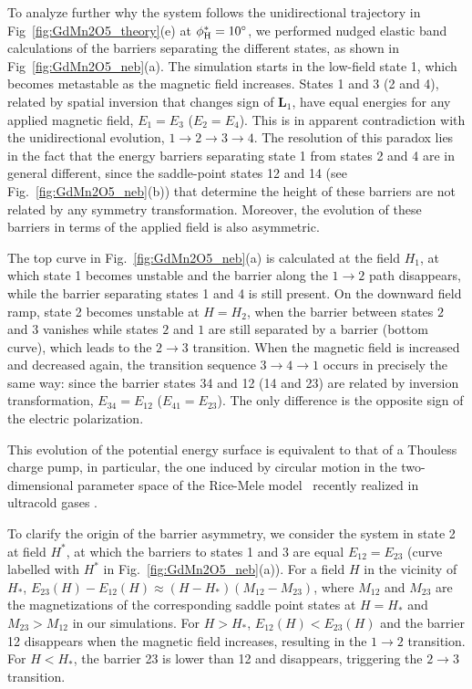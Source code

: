 To analyze further why the system follows the unidirectional trajectory in Fig~\ref{fig:GdMn2O5_theory}(e) at $\phi_{\rm H}^\ast=10^\circ$, we performed nudged elastic band calculations of the barriers separating the different states, as shown in Fig~\ref{fig:GdMn2O5_neb}(a).
%
The simulation starts in the low-field state 1, which becomes metastable as the magnetic field increases. 
States 1 and 3 (2 and 4), related by spatial inversion that changes sign of $\bm{L}_1$, have equal energies for any applied magnetic field, $E_1 = E_3$ ($E_2 = E_4$).
This is in apparent contradiction with the unidirectional evolution, $1 \rightarrow 2 \rightarrow 3 \rightarrow 4$.
%
The resolution of this paradox lies in the fact that the energy barriers separating state 1 from states 2 and 4 are in general different, since the saddle-point states 12 and 14 (see Fig.~\ref{fig:GdMn2O5_neb}(b)) that determine the height of these barriers are not related by any symmetry transformation.
Moreover, the evolution of these barriers in terms of the applied field is also asymmetric.

The top curve in Fig.~\ref{fig:GdMn2O5_neb}(a) is calculated at the field $H_{1}$, at which state 1 becomes unstable and the barrier along the $1\to 2$ path disappears, while the barrier separating states 1 and 4 is still present. 
%
On the downward field ramp, state 2 becomes unstable at $H = H_2$, when the barrier between states $2$ and $3$ vanishes while states $2$ and $1$ are still separated by a barrier (bottom curve), which leads to the $2\to3$ transition.
%
When the magnetic field is increased and decreased again, the transition sequence $3 \to 4 \to 1$ occurs in precisely the same way: since the barrier states 34 and 12  (14 and 23) are related by inversion transformation,  $E_{34} = E_{12}$ ($E_{41} = E_{23}$). 
%
The only difference is the opposite sign of the electric polarization. 

This evolution of the potential energy surface is equivalent to that of a Thouless charge pump, in particular, the one induced by circular motion in the two-dimensional parameter space of the Rice-Mele model~\cite{Rice82} recently realized in ultracold gases \cite{Lohse16,Nakajima16,Atala13}.

To clarify the origin of the barrier asymmetry, we consider the system in state 2 at field $H^*$, at which the barriers to states 1 and 3 are equal $E_{12} = E_{23}$ (curve labelled with $H^*$ in Fig.~\ref{fig:GdMn2O5_neb}(a)).
For a field $H$ in the vicinity of $H_\ast$, $E_{23}(H) - E_{12}(H) \approx (H - H_\ast)(M_{12} - M_{23})$, where $M_{12}$ and $M_{23}$ are the magnetizations of the corresponding saddle point states at $H = H_\ast$ and $M_{23} > M_{12}$ in our simulations.
For $H > H_\ast$, $E_{12}(H) < E_{23}(H)$ and the barrier 12 disappears when the magnetic field increases, resulting in the $1 \to 2$ transition. For $H < H_\ast$, the barrier 23 is lower than 12 and disappears, triggering the $2 \to 3$ transition.


